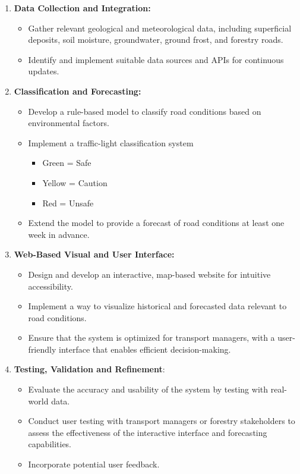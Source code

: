 \begin{enumerate}
    \item \textbf{Data Collection and Integration:}
    \begin{itemize}
        \item Gather relevant geological and meteorological data, including superficial deposits, soil moisture, groundwater, ground frost, and forestry roads.
        \item Identify and implement suitable data sources and APIs for continuous updates.
    \end{itemize}
    
    \item \textbf{Classification and Forecasting:}
    \begin{itemize}
        \item Develop a rule-based model to classify road conditions based on environmental factors. 
        \item Implement a traffic-light classification system
        \begin{itemize}
            \item Green = Safe
            \item Yellow = Caution
            \item Red = Unsafe
        \end{itemize}
        \item Extend the model to provide a forecast of road conditions at least one week in advance. 
    \end{itemize}
    
    \item \textbf{Web-Based Visual and User Interface:}
    \begin{itemize}
        \item Design and develop an interactive, map-based website for intuitive accessibility. 
        \item Implement a way to visualize historical and forecasted data relevant to road conditions.
        \item Ensure that the system is optimized for transport managers, with a user-friendly interface that enables efficient decision-making. 
    \end{itemize}
    
    \item \textbf{Testing, Validation and Refinement}:
    \begin{itemize}
        \item Evaluate the accuracy and usability of the system by testing with real-world data. 
        \item Conduct user testing with transport managers or forestry stakeholders to assess the effectiveness of the interactive interface and forecasting capabilities. 
        \item Incorporate potential user feedback. 
    \end{itemize} 
\end{enumerate}


